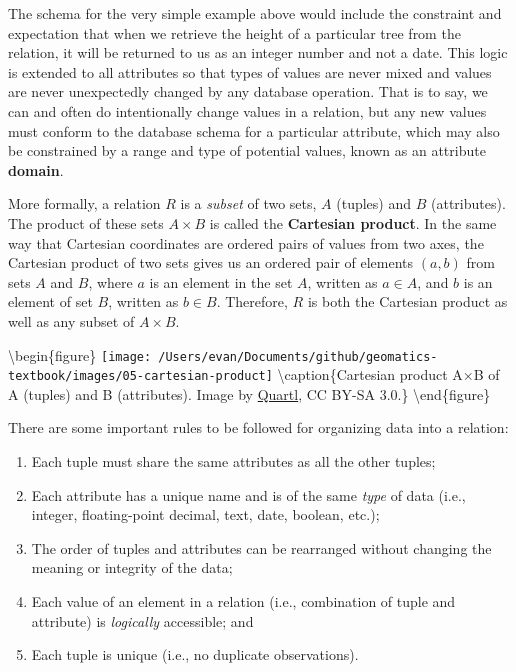 \documentclass[
]{book}
\providecommand{\tightlist}{%
  \setlength{\itemsep}{0pt}\setlength{\parskip}{0pt}}
\begin{document}
The schema for the very simple example above would include the constraint and expectation that when we retrieve the height of a particular tree from the relation, it will be returned to us as an integer number and not a date. This logic is extended to all attributes so that types of values are never mixed and values are never unexpectedly changed by any database operation. That is to say, we can and often do intentionally change values in a relation, but any new values must conform to the database schema for a particular attribute, which may also be constrained by a range and type of potential values, known as an attribute \textbf{domain}.

More formally, a relation \(R\) is a \emph{subset} of two sets, \(A\) (tuples) and \(B\) (attributes). The product of these sets \(A×B\) is called the \textbf{Cartesian product}. In the same way that Cartesian coordinates are ordered pairs of values from two axes, the Cartesian product of two sets gives us an ordered pair of elements \((a,b)\) from sets \(A\) and \(B\), where \(a\) is an element in the set \(A\), written as \(a∈A\), and \(b\) is an element of set \(B\), written as \(b∈B\). Therefore, \(R\) is both the Cartesian product as well as any subset of \(A×B\).

\textbackslash begin\{figure\}
\texttt{[image: /Users/evan/Documents/github/geomatics-textbook/images/05-cartesian-product]} \textbackslash caption\{Cartesian product A×B of A (tuples) and B (attributes). Image by \href{https://en.wikipedia.org/wiki/Cartesian_product\#/media/File:Cartesian_Product_qtl1.svg}{Quartl}, CC BY-SA 3.0.\}\label{fig:5-cartesian-product}
\textbackslash end\{figure\}

There are some important rules to be followed for organizing data into a relation:

\begin{enumerate}
\def\labelenumi{\arabic{enumi}.}
\tightlist
\item
  Each tuple must share the same attributes as all the other tuples;
\item
  Each attribute has a unique name and is of the same \emph{type} of data (i.e., integer, floating-point decimal, text, date, boolean, etc.);
\item
  The order of tuples and attributes can be rearranged without changing the meaning or integrity of the data;
\item
  Each value of an element in a relation (i.e., combination of tuple and attribute) is \emph{logically} accessible; and
\item
  Each tuple is unique (i.e., no duplicate observations).
\end{enumerate}
\end{document}
